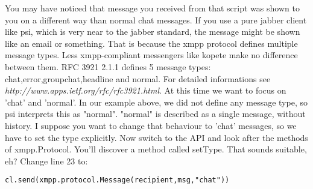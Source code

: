 You may have noticed that message you received from that script was shown to you on a different way than normal chat messages. If you use a pure jabber client like psi, which is very near to the jabber standard, the message might be shown like an email or something. That is because the xmpp protocol defines multiple message types. Less xmpp-compliant messengers like kopete make no difference between them.
\newline
\newline
RFC 3921 2.1.1 defines 5 message types:	chat,error,groupchat,headline and normal. For detailed informations see \textit{http://www.apps.ietf.org/rfc/rfc3921.html}.
\newline
At this time we want to focus on 'chat' and 'normal'. In our example above, we did not define any message type, so
psi interprets this as "normal". "normal" is described as a single message, without history. I suppose
you want to change that behaviour to 'chat' messages, so we have to set the type explicitly.
Now switch to the API and look after the methods of xmpp.Protocol. You'll discover a method called setType.
That sounds suitable, eh? Change line 23 to:
\begin{verbatim}
cl.send(xmpp.protocol.Message(recipient,msg,"chat"))
\end{verbatim}
















